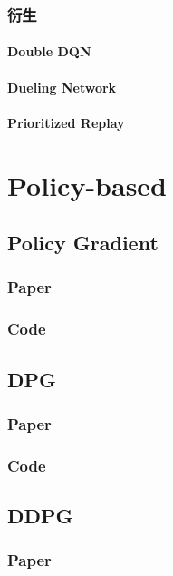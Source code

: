 \documentclass{book}
\begin{document}
\subsection{衍生}
\subsubsection{Double DQN}
\subsubsection{Dueling Network}
\subsubsection{Prioritized Replay}
\chapter{Policy-based}
\section{Policy Gradient}
\subsection{Paper}
\subsection{Code}
\section{DPG}
\subsection{Paper}
\subsection{Code}
\section{DDPG}
\subsection{Paper}
\end{document}
